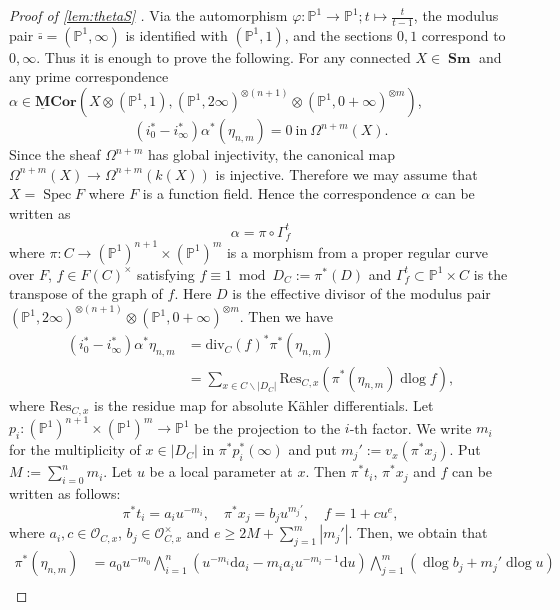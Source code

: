 \documentclass[a4paper,12pt,reqno]{amsart}
\numberwithin{equation}{section}
\theoremstyle{definition}
\newcommand{\bP}{\mathbb{P}}
\DeclareMathOperator{\dlog}{dlog}
\DeclareMathOperator{\Spec}{Spec}
\newcommand{\Gm}{\mathbb{G}_{m}}
\newcommand{\Ga}{\mathbb{G}_{a}}
\newcommand{\bcube}{{\overline{\square}}}
\renewcommand{\d}{\mathrm{d}}
\newcommand{\Sm}{\operatorname{\mathbf{Sm}}}
\newcommand{\ulMCor}{\operatorname{\mathbf{{\underline{M}}Cor}}}
\begin{document}
\begin{proof}[Proof of \autoref{lem:thetaS} ]
    Via the automorphism $\varphi:\bP^1\to\bP^1; t\mapsto\frac{t}{t-1}$, the modulus pair $\bcube=(\bP^1,\infty)$ is identified with $(\bP^1,1)$, and the sections $0,1$ correspond to $0,\infty$.
    Thus it is enough to prove the following. For any connected $X\in \Sm$ and any prime correspondence $\alpha\in \ulMCor(X\otimes (\bP^1,1), (\bP^1,2\infty)^{\otimes (n+1)}\otimes (\bP^1,0+\infty)^{\otimes m})$,
    \[
    (i_0^\ast-i_\infty^\ast)\alpha^\ast (\eta_{n,m})=0 \ \text{in}\ \Omega^{n+m}(X).
    \]
    Since the sheaf $\Omega^{n+m}$ has global injectivity, the canonical map $\Omega^{n+m}(X)\to \Omega^{n+m}(k(X))$ is injective.
    Therefore we may assume that $X=\Spec F$ where $F$ is a function field.
    Hence the correspondence $\alpha$ can be written as
    \[
    \alpha=\pi\circ \Gamma_f^t
    \]
    where $\pi: C\to (\bP^1)^{n+1}\times (\bP^1)^m$ is a morphism from a proper regular curve over $F$, $f\in F(C)^\times$ satisfying $f\equiv 1 \bmod D_C:=\pi^*(D)$ and $\Gamma_f^t\subset \bP^1\times C$ is the transpose of the graph of $f$.
    Here $D$ is the effective divisor of the modulus pair $(\bP^1,2\infty)^{\otimes (n+1)}\otimes (\bP^1,0+\infty)^{\otimes m}$. 
    Then we have
    \begin{align}\label{eq:res}
        (i_0^\ast-i_\infty^\ast)\alpha^\ast \eta_{n,m}
        &=\mathrm{div}_C(f)^\ast \pi^\ast(\eta_{n,m})\\
        &=\sum_{x\in C\smallsetminus |D_C|}\mathrm{Res}_{C,x}(\pi^\ast(\eta_{n,m})\dlog f ),
    \end{align}
    where $\mathrm{Res}_{C,x}$ is the residue map for absolute K\"ahler differentials. 
    Let $p_i:(\bP^1)^{n+1}\times (\bP^1)^m\to \bP^1$ be the projection to the $i$-th factor.
We write $m_i$ for the multiplicity of $x\in|D_C|$ in $\pi^*p_i^*(\infty)$ and put $m_j':=v_x(\pi^*x_j)$.
Put $M:=\sum_{i=0}^n m_i$.
Let $u$ be a local parameter at $x$.
Then $\pi^*t_i$, $\pi^*x_j$ and $f$ can be written as follows:
\[
\pi^*t_i=a_i u^{-m_i},\quad \pi^*x_j=b_j u^{m_j'},\quad f=1+cu^e,
\]
where $a_i,c\in\mathcal{O}_{C,x}$, $b_j\in\mathcal{O}_{C,x}^\times$ and $e\geq 2M+\sum_{j=1}^m |m_j'|$. 
    Then, we obtain that 
    \begin{align}
        \pi^\ast(\eta_{n,m})
        &=a_0u^{-m_0}\bigwedge_{i=1}^n(u^{-m_i}\d a_i-m_ia_iu^{-m_i-1}\d u)\bigwedge_{j=1}^m(\dlog b_j+m_j'\dlog u)\\

\end{align}
\end{proof}
\end{document}
